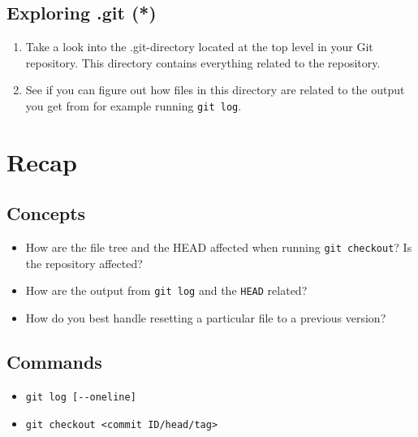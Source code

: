 \documentclass[../main/git_course_main.tex]{subfiles}
\begin{document}
	\subsection{Exploring .git (*)}
	
	\begin{enumerate}
		\item Take a look into the .git-directory located at the top level in your Git repository. This directory contains everything related to the repository.
		\item See if you can figure out how files in this directory are related to the output you get from for example running \verb$git log$.
	\end{enumerate}
	
	\newpage
	\section{Recap}
	
	\subsection{Concepts}
	
	\begin{itemize}
		\item How are the file tree and the HEAD affected when running \verb$git checkout$? Is the repository affected?
		\item How are the output from \verb$git log$ and the \verb$HEAD$ related?
		\item How do you best handle resetting a particular file to a previous version?
	\end{itemize}
	
	\subsection{Commands}
	
	\begin{itemize}
		\item \verb$git log [--oneline]$
		\item \verb$git checkout <commit ID/head/tag>$
	\end{itemize}
	
\end{document}

